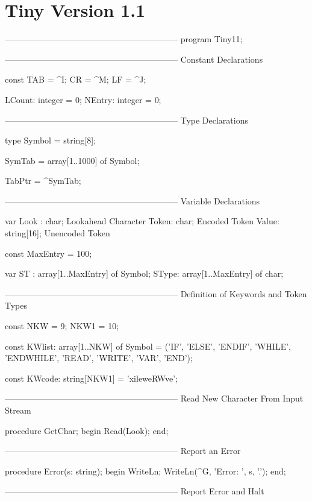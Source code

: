 \documentclass[float=false, crop=false]{standalone}
\begin{document}
\section{Tiny Version 1.1}

\begin{code}
{--------------------------------------------------------------}
program Tiny11;

{--------------------------------------------------------------}
{ Constant Declarations }

const TAB = ^I;
      CR  = ^M;
      LF  = ^J;

      LCount: integer = 0;
      NEntry: integer = 0;


{--------------------------------------------------------------}
{ Type Declarations }

type Symbol = string[8];

     SymTab = array[1..1000] of Symbol;

     TabPtr = ^SymTab;


{--------------------------------------------------------------}
{ Variable Declarations }

var Look : char;             { Lookahead Character }
    Token: char;             { Encoded Token       }
    Value: string[16];       { Unencoded Token     }


const MaxEntry = 100;

var ST   : array[1..MaxEntry] of Symbol;
    SType: array[1..MaxEntry] of char;


{--------------------------------------------------------------}
{ Definition of Keywords and Token Types }

const NKW =   9;
      NKW1 = 10;

const KWlist: array[1..NKW] of Symbol =
              ('IF', 'ELSE', 'ENDIF', 'WHILE', 'ENDWHILE',
               'READ', 'WRITE', 'VAR', 'END');

const KWcode: string[NKW1] = 'xileweRWve';


{--------------------------------------------------------------}
{ Read New Character From Input Stream }

procedure GetChar;
begin
   Read(Look);
end;

{--------------------------------------------------------------}
{ Report an Error }

procedure Error(s: string);
begin
   WriteLn;
   WriteLn(^G, 'Error: ', s, '.');
end;


{--------------------------------------------------------------}
{ Report Error and Halt }


\end{code}
\end{document}
